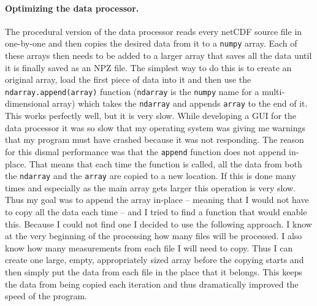 \documentclass[../00_main.tex]{subfiles}
\begin{document}
\paragraph{Optimizing the data processor.} The procedural version of the data
processor reads every netCDF source file in one-by-one and then copies the
desired data from it to a \texttt{numpy} array. Each of these arrays then needs
to be added to a larger array that saves all the data until it is finally saved
as an NPZ file. The simplest way to do this is to create an original array,
load the first piece of data into it and then use the
\texttt{ndarray.append(array)}
function (\texttt{ndarray} is the \texttt{numpy} name for a multi-dimensional
array) which takes the \texttt{ndarray} and appends \texttt{array} to the end of
it. This works perfectly well, but it is very slow. While developing a GUI for
the data processor it was so slow that my operating system was giving me
warnings that my program must have crashed because it was not responding. The
reason for this dismal performance was that the \texttt{append} function does
not append in-place. That means that each time the function is called, all the
data from both the \texttt{ndarray} and the \texttt{array} are copied to a new
location. If this is done many times and especially as the main array gets
larger this operation is very slow. Thus my goal was to append the array
in-place -- meaning that I would not have to copy all the data each time -- and
I tried to find a function that would enable this. Because I could not find one
I decided to use the following approach. I know at the very beginning of the
processing how many files will be processed. I also know how many measurements
from each file I will need to copy. Thus I can create one large, empty,
appropriately sized array before the copying starts and then simply put the
data from each file in the place that it belongs. This keeps the data from
being copied each iteration and thus dramatically improved the speed of the
program.
\end{document}
